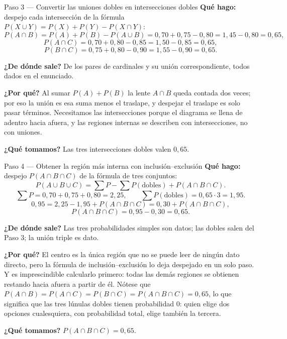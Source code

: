 \documentclass[11pt]{article}
\begin{document}
\begin{paso}{Paso 3 --- Convertir las uniones dobles en intersecciones dobles}
\textbf{Qué hago:} despejo cada intersección de la fórmula $P(X\cup Y)=P(X)+P(Y)-P(X\cap Y)$:
\[
P(A\cap B) = P(A)+P(B)-P(A\cup B) = 0{,}70+0{,}75-0{,}80 = 1{,}45-0{,}80 = 0{,}65,
\]
\[
P(A\cap C) = 0{,}70+0{,}80-0{,}85 = 1{,}50-0{,}85 = 0{,}65,
\]
\[
P(B\cap C) = 0{,}75+0{,}80-0{,}90 = 1{,}55-0{,}90 = 0{,}65 .
\]

\textbf{¿De dónde sale?} De los pares de cardinales y su unión correspondiente, todos dados en el
enunciado.

\textbf{¿Por qué?} Al sumar $P(A)+P(B)$ la lente $A\cap B$ queda contada dos veces; por eso la unión es
esa suma menos el traslape, y despejar el traslape es solo pasar términos. Necesitamos las intersecciones
porque el diagrama se llena de adentro hacia afuera, y las regiones internas se describen con
intersecciones, no con uniones.

\textbf{¿Qué tomamos?} Las tres intersecciones dobles valen $0{,}65$.
\end{paso}

\begin{paso}{Paso 4 --- Obtener la región más interna con inclusión--exclusión}
\textbf{Qué hago:} despejo $P(A\cap B\cap C)$ de la fórmula de tres conjuntos:
\[
P(A\cup B\cup C) = \sum P - \sum P(\text{dobles}) + P(A\cap B\cap C).
\]
\[
\sum P = 0{,}70+0{,}75+0{,}80 = 2{,}25,\qquad \sum P(\text{dobles}) = 0{,}65\cdot 3 = 1{,}95 .
\]
\[
0{,}95 = 2{,}25 - 1{,}95 + P(A\cap B\cap C) = 0{,}30 + P(A\cap B\cap C),
\]
\[
P(A\cap B\cap C) = 0{,}95-0{,}30 = 0{,}65 .
\]

\textbf{¿De dónde sale?} Las tres probabilidades simples son datos; las dobles salen del Paso 3; la unión
triple es dato.

\textbf{¿Por qué?} El centro es la única región que no se puede leer de ningún dato directo, pero la
fórmula de inclusión--exclusión lo deja despejado en un solo paso. Y es imprescindible calcularlo primero:
todas las demás regiones se obtienen restando hacia afuera a partir de él. Nótese que
$P(A\cap B)=P(A\cap C)=P(B\cap C)=P(A\cap B\cap C)=0{,}65$, lo que significa que las tres lúnulas dobles
tienen probabilidad $0$: quien elige dos opciones cualesquiera, con probabilidad total, elige también la
tercera.

\textbf{¿Qué tomamos?} $P(A\cap B\cap C)=0{,}65$.
\end{paso}
\end{document}
